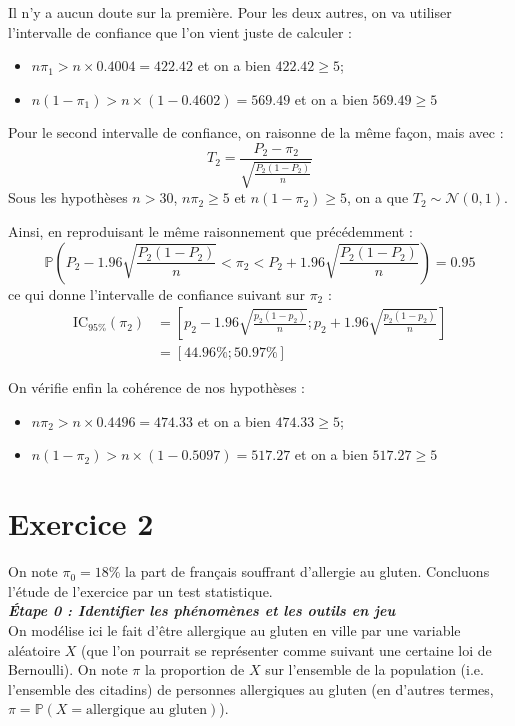 \documentclass[a4paper,oneside,12pt]{article}
\theoremstyle{plain}
\def\P{{\mathbb P}}
\begin{document}
Il n'y a aucun doute sur la première. Pour les deux autres, on va utiliser l'intervalle de confiance que l'on vient juste de calculer :
\begin{itemize}
    \item $n\pi_1 > n\times0.4004 = 422.42$ et on a bien $422.42 \ge 5$;
    \item $n(1-\pi_1) > n \times (1-0.4602) = 569.49$ et on a bien $569.49 \ge 5$
\end{itemize}

Pour le second intervalle de confiance, on raisonne de la même façon, mais avec :
$$T_2 = \frac{P_2-\pi_2}{\sqrt{\frac{P_2(1-P_2)}{n}}}$$
Sous les hypothèses $n>30$, $n\pi_2\ge 5$ et $n(1-\pi_2)\ge 5$, on a que $T_2 \sim \mathcal{N}(0,1)$.

Ainsi, en reproduisant le même raisonnement que précédemment :
$$\P\left( P_2 -1.96\sqrt{\frac{P_2(1-P_2)}{n}}<\pi_2<P_2+1.96\sqrt{\frac{P_2(1-P_2)}{n}}\right) = 0.95$$
ce qui donne l'intervalle de confiance suivant sur $\pi_2$ :
\begin{align*}
    \mbox{IC}_{95\%}(\pi_2) &= \left[p_2-1.96\sqrt{\frac{p_2(1-p_2)}{n}} ; p_2+1.96\sqrt{\frac{p_2(1-p_2)}{n}}\right]\\
    &=[44.96\%;50.97\%]
\end{align*}

On vérifie enfin la cohérence de nos hypothèses :
\begin{itemize}
    \item $n\pi_2 > n\times0.4496 = 474.33$ et on a bien $474.33 \ge 5$;
    \item $n(1-\pi_2) > n \times (1-0.5097) = 517.27$ et on a bien $517.27 \ge 5$
\end{itemize}



\section*{Exercice 2}

On note $\pi_0 = 18\%$ la part de français souffrant d'allergie au gluten. Concluons l'étude de l'exercice par un test statistique.\\

\textit{\textbf{Étape 0 : Identifier les phénomènes et les outils en jeu}}\\
On modélise ici le fait d'être allergique au gluten en ville par une variable aléatoire $X$ (que l'on pourrait se représenter comme suivant une certaine loi de Bernoulli). On note $\pi$ la proportion de $X$ sur l'ensemble de la population (i.e. l'ensemble des citadins) de personnes allergiques au gluten (en d'autres termes, $\pi = \P(X = \mbox{allergique au gluten})$).\\
    
\end{document}
